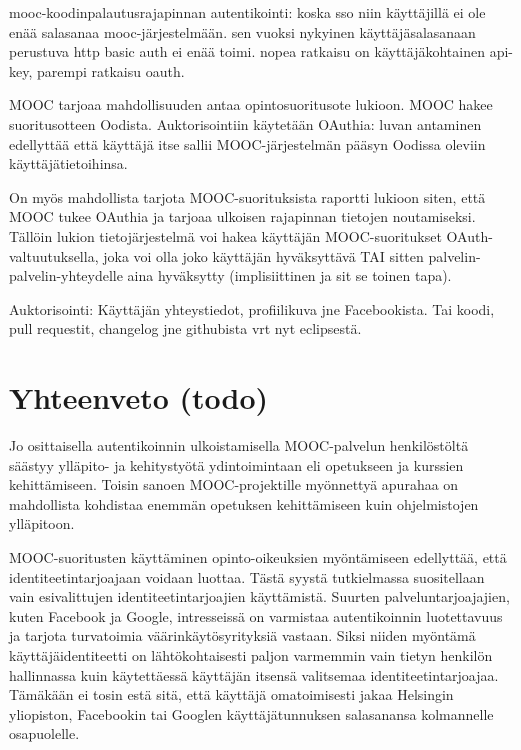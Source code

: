 \documentclass[finnish,gradu]{tktltiki}
\begin{document}
  mooc-koodinpalautusrajapinnan autentikointi: koska sso niin käyttäjillä ei ole enää salasanaa mooc-järjestelmään. sen vuoksi nykyinen käyttäjäsalasanaan perustuva http basic auth ei enää toimi. nopea ratkaisu on käyttäjäkohtainen api-key, parempi ratkaisu oauth.

  MOOC tarjoaa mahdollisuuden antaa opintosuoritusote lukioon. MOOC hakee suoritusotteen Oodista. Auktorisointiin käytetään OAuthia: luvan antaminen edellyttää että käyttäjä itse sallii MOOC-järjestelmän pääsyn Oodissa oleviin käyttäjätietoihinsa.

  On myös mahdollista tarjota MOOC-suorituksista raportti lukioon siten, että MOOC tukee OAuthia ja tarjoaa ulkoisen rajapinnan tietojen noutamiseksi. Tällöin lukion tietojärjestelmä voi hakea käyttäjän MOOC-suoritukset OAuth-valtuutuksella, joka voi olla joko käyttäjän hyväksyttävä TAI sitten palvelin-palvelin-yhteydelle aina hyväksytty (implisiittinen ja sit se toinen tapa).

  Auktorisointi: Käyttäjän yhteystiedot, profiilikuva jne Facebookista. Tai koodi, pull requestit, changelog jne githubista vrt nyt eclipsestä.









\newpage
\section{Yhteenveto (todo)} %
\label{sec:yhteenveto}

  Jo osittaisella autentikoinnin ulkoistamisella MOOC-palvelun henkilöstöltä säästyy ylläpito- ja kehitystyötä ydintoimintaan eli opetukseen ja kurssien kehittämiseen. Toisin sanoen MOOC-projektille myönnettyä apurahaa on mahdollista kohdistaa enemmän opetuksen kehittämiseen kuin ohjelmistojen ylläpitoon.

  MOOC-suoritusten käyttäminen opinto-oikeuksien myöntämiseen edellyttää, että identiteetintarjoajaan voidaan luottaa. Tästä syystä tutkielmassa suositellaan vain esivalittujen identiteetintarjoajien käyttämistä. Suurten palveluntarjoajajien, kuten Facebook ja Google, intresseissä on varmistaa autentikoinnin luotettavuus ja tarjota turvatoimia väärinkäytösyrityksiä vastaan. Siksi niiden myöntämä käyttäjäidentiteetti on lähtökohtaisesti paljon varmemmin vain tietyn henkilön hallinnassa kuin käytettäessä käyttäjän itsensä valitsemaa identiteetintarjoajaa. Tämäkään ei tosin estä sitä, että käyttäjä omatoimisesti jakaa Helsingin yliopiston, Facebookin tai Googlen käyttäjätunnuksen salasanansa kolmannelle osapuolelle.
\end{document}

